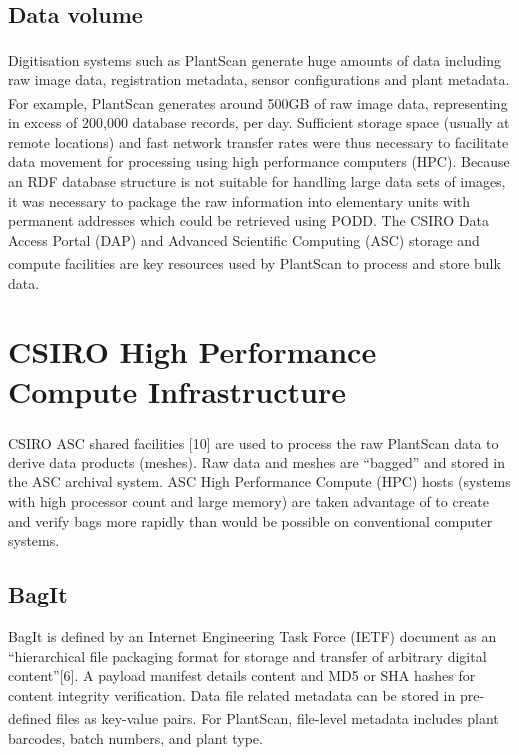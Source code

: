\documentclass{llncs}
\begin{document}
\subsection{Data volume}
Digitisation systems such as PlantScan\textsuperscript{\texttrademark} generate
huge amounts of data including
raw image data, registration metadata, sensor configurations and plant metadata.
For example, PlantScan\textsuperscript{\texttrademark} generates around 500GB of
raw image data, representing
in excess of 200,000 database records, per day. Sufficient storage space
(usually at remote locations) and fast network transfer rates were thus
necessary to facilitate data movement for processing using high performance
computers (HPC). Because an RDF database structure is not suitable for handling
large data sets of images, it was necessary to package the raw information into
elementary units with permanent addresses which could be retrieved using PODD. 
The CSIRO Data Access Portal (DAP) \cite{DAP} and Advanced
Scientific Computing (ASC) storage and compute facilities \cite{ASC} are key resources used by
PlantScan\textsuperscript{\texttrademark} to
process and store bulk data.


\section{CSIRO High Performance Compute Infrastructure}
CSIRO ASC shared facilities [10] are used to process the raw
PlantScan\textsuperscript{\texttrademark} data to
derive data products (meshes). Raw data and meshes are ``bagged'' and stored in
the ASC archival system. ASC High Performance Compute (HPC) hosts (systems with
high processor count and large memory) are taken advantage of to create and
verify bags more rapidly than would be possible on conventional computer
systems.

\subsection{BagIt}

BagIt is defined by an Internet Engineering Task Force (IETF) document as an
``hierarchical file packaging format for storage and transfer of arbitrary
digital content''[6]. A payload manifest details content and MD5 or SHA hashes
for content integrity verification. Data file related metadata can be stored in
pre-defined files as key-value pairs. For
PlantScan\textsuperscript{\texttrademark}, file-level metadata
includes plant barcodes, batch numbers, and plant type.
\end{document}
